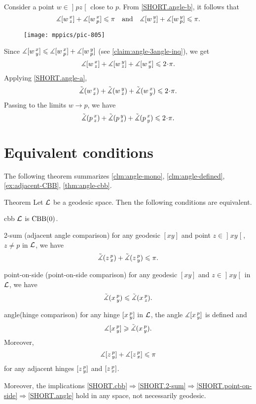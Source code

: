 Consider a point  $w\in \mathopen{]} p z \mathclose{[}$ close to $p$.
From \ref{SHORT.angle-b}, it follows that 
\[\measuredangle[w\,{}^{x}_{z}]+ \measuredangle[w\,{}^{x}_{p}]\leqslant\pi\quad \text{and}\quad \measuredangle[w\,{}^{y}_{z}] + \measuredangle[w\,{}^{y}_{p}]\leqslant\pi.\]

\begin{wrapfigure}{o}{30 mm}
\vskip-4mm
\centering
\texttt{[image: mppics/pic-805]}
\vskip4mm
\end{wrapfigure}

Since $\measuredangle[w\,{}^{x}_{y}]\leqslant \measuredangle[w\,{}^{x}_{p}] +\measuredangle[w\,{}^{y}_{p}]$ (see \ref{claim:angle-3angle-inq}), we get 
\[\mangle\hinge w x z+ \mangle\hinge w y z +\mangle\hinge w x y
\le
2\cdot\pi.\]
Applying \ref{SHORT.angle-a}, 
\[\angk w x z
+ \angk w y z 
+\angk w x y
\le
2\cdot\pi.\]
Passing to the limits $w\to p$, we have
\[\angk p x z 
+ \angk p y z 
+\angk p x y
\le
2\cdot\pi.\]
\qedsf

\section{Equivalent conditions}

The following theorem summarizes \ref{clm:angle-mono}, \ref{clm:angle-defined}, \ref{ex:adjacent-CBB}, \ref{thm:angle-cbb}.

\begin{thm}{Theorem}\label{thm:defs_of_alex} 
Let $\mathcal{L}$ be a geodesic space.
Then the following conditions are equivalent.

\begin{subthm}{cbb}
$\mathcal{L}$ is $\mathrm{CBB}(0)$.
\end{subthm}
 

\begin{subthm}{2-sum} 
(adjacent angle comparison) for any geodesic $[x y]$ and point $z\in \mathopen{]}x y\mathclose{[}$, $z\ne p$ in $\mathcal{L}$, we have
\[\tilde\measuredangle(z\,{}^{p}_{x})
+\tilde\measuredangle(z\,{}^{p}_{y})\leqslant \pi.\]
\end{subthm}

\begin{subthm}{point-on-side}
(point-on-side comparison)
for any geodesic $[x y]$ and $z\in \mathopen{]}x y\mathclose{[}$ in $\mathcal{L}$, we have
\[\tilde\measuredangle(x\,{}^{p}_{y})\leqslant\tilde\measuredangle(x\,{}^{p}_{z}).\]
\end{subthm}

\begin{subthm}{angle}(hinge comparison)
for any hinge $[x\,{}^{p}_{y}]$ in $\mathcal{L}$, the angle 
$\measuredangle[x\,{}^{p}_{y}]$ is defined and 
\[\measuredangle[x\,{}^{p}_{y}]\geqslant\tilde\measuredangle(x\,{}^{p}_{y}).\]
Moreover, 
\[\measuredangle[z\,{}^{p}_{y}] + \measuredangle[z\,{}^{p}_{x}]\leqslant\pi\]
for any adjacent hinges $[z\,{}^{p}_{y}]$ and $[z\,{}^{p}_{x}]$.
\end{subthm}

Moreover, the implications \ref{SHORT.cbb}$\Rightarrow$\ref{SHORT.2-sum}$\Rightarrow$\ref{SHORT.point-on-side}$\Rightarrow$\ref{SHORT.angle} hold in any space, not necessarily geodesic.
\end{thm}

